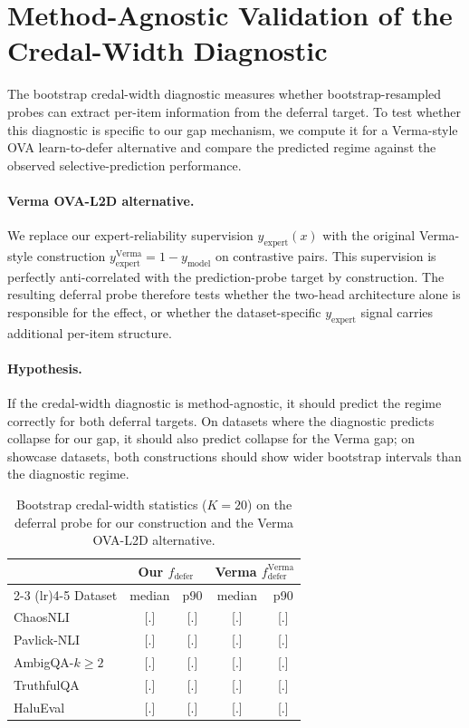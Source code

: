 \section{Method-Agnostic Validation of the Credal-Width Diagnostic}
\label{app:diagnostic-generic}

The bootstrap credal-width diagnostic measures whether bootstrap-resampled
probes can extract per-item information from the deferral target. To test
whether this diagnostic is specific to our gap mechanism, we compute it for a
Verma-style OVA learn-to-defer alternative and compare the predicted regime
against the observed selective-prediction performance.

\paragraph{Verma OVA-L2D alternative.}
We replace our expert-reliability supervision $y_{\text{expert}}(x)$ with the
original Verma-style construction $y_{\text{expert}}^{\text{Verma}} =
1-y_{\text{model}}$ on contrastive pairs. This supervision is perfectly
anti-correlated with the prediction-probe target by construction. The resulting
deferral probe therefore tests whether the two-head architecture alone is
responsible for the effect, or whether the dataset-specific
$y_{\text{expert}}$ signal carries additional per-item structure.

\paragraph{Hypothesis.}
If the credal-width diagnostic is method-agnostic, it should predict the
regime correctly for both deferral targets. On datasets where the diagnostic
predicts collapse for our gap, it should also predict collapse for the Verma
gap; on showcase datasets, both constructions should show wider bootstrap
intervals than the diagnostic regime.

\begin{table}[h]
\centering
\small
\begin{tabular}{lcccc}
\toprule
& \multicolumn{2}{c}{Our $f_{\text{defer}}$}
& \multicolumn{2}{c}{Verma $f_{\text{defer}}^{\text{Verma}}$} \\
\cmidrule(lr){2-3} \cmidrule(lr){4-5}
Dataset & median & p90 & median & p90 \\
\midrule
ChaosNLI       & [.] & [.] & [.] & [.] \\
Pavlick-NLI    & [.] & [.] & [.] & [.] \\
AmbigQA-$k{\geq}2$ & [.] & [.] & [.] & [.] \\
TruthfulQA     & [.] & [.] & [.] & [.] \\
HaluEval       & [.] & [.] & [.] & [.] \\
\bottomrule
\end{tabular}
\caption{Bootstrap credal-width statistics ($K=20$) on the deferral probe for
our construction and the Verma OVA-L2D alternative.}
\label{tab:diagnostic-generic}
\end{table}

